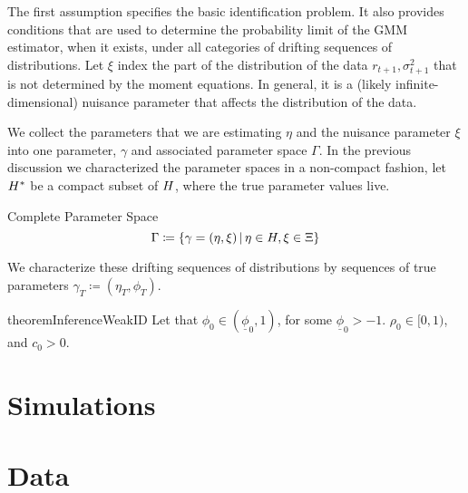\documentclass[11pt, letterpaper, twoside, final]{article}
\begin{document}
The first assumption specifies the basic identification
problem. It also provides conditions that are used to determine the
probability limit of the GMM estimator, when it exists, under all categories
of drifting sequences of distributions.
Let $\xi$ index the part of the distribution of the data $r_{t+1}, \sigma^2_{t+1}$ that is not determined by the
moment equations.
In general, it is a (likely infinite-dimensional) nuisance parameter that affects the distribution of the data. 


We collect the parameters that we are estimating $\eta$ and the nuisance parameter $\xi$ into one parameter,
$\gamma$ and associated parameter space $\Gamma$.
In the previous discussion we characterized the parameter spaces in a non-compact fashion, let $H^{*}$ be a
compact subset of $H$, where the true parameter values live.

\begin{defn}{Complete Parameter Space}
    \begin{equation}
        \Gamma \coloneqq \left\lbrace \gamma = (\eta, \xi) \,\middle\vert\, \eta \in H, \xi \in \Xi \right\rbrace 
    \end{equation}
\end{defn}

We characterize these drifting sequences of distributions by sequences of true parameters $\gamma_T \coloneqq
(\eta_T, \phi_T)$.


\begin{restatable}{theorem}{InferenceWeakID}
    Let that $\phi_0  \in (\underline{\phi}_0,1)$, for some $\underline{\phi}_0 > -1$. 
    $\rho_0 \in [0,1)$, and $c_0 > 0$. 

\end{restatable}


\section{Simulations}

\section{Data}\label{sec:data}
\end{document}
